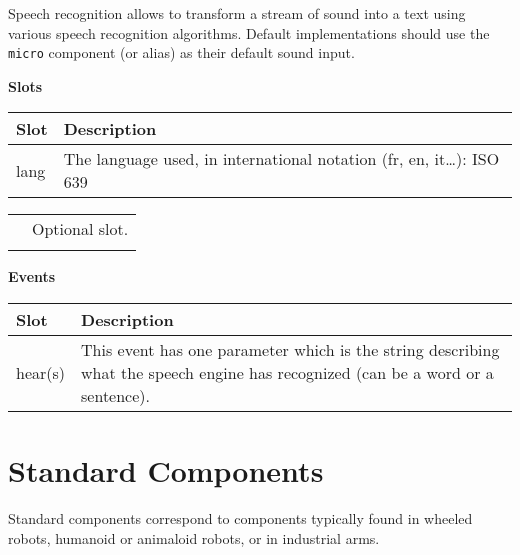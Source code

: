 \documentclass[a4paper]{article}
\begin{document}
{\sffamily
Speech recognition allows to transform a stream of sound into a text
using various speech recognition algorithms. Default implementations
should use the \texttt{micro} component (or alias) as their default
sound input.}

{\sffamily\bfseries
Slots}

\begin{flushleft}
\tablehead{}
\begin{supertabular}{|m{3.293cm}|m{11.997cm}|}
\hline
{}\sffamily\bfseries Slot &
\sffamily\bfseries Description\\\hline
{} lang &
\sffamily The language used, in international
notation (fr, en, it…): ISO 639\\\hline
\end{supertabular}
\end{flushleft}
\begin{flushleft}
\tablehead{}
\begin{supertabular}{|m{1.717cm}|m{10.464cm}}
\hhline{-~}
 &
\sffamily Optional slot.\\\hhline{-~}
\end{supertabular}
\end{flushleft}
{\sffamily\bfseries
Events}

\begin{flushleft}
\tablehead{}
\begin{supertabular}{|m{3.293cm}|m{11.997cm}|}
\hline
{}\sffamily\bfseries Slot &
\sffamily\bfseries Description\\\hline
{} hear(s) &
\sffamily This event has one parameter which is
the string describing what the speech engine has recognized (can be a
word or a sentence).\\\hline
\end{supertabular}
\end{flushleft}
\section[Standard Components]{ Standard
Components}
{\sffamily
Standard components correspond to components typically found in wheeled
robots, humanoid or animaloid robots, or in industrial arms. }
\end{document}
